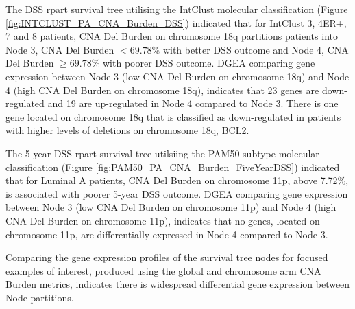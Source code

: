 The DSS rpart survival tree utilising the IntClust molecular classification (Figure \ref{fig:INTCLUST_PA_CNA_Burden_DSS}) indicated that for IntClust 3, 4ER+, 7 and 8 patients, CNA Del Burden on chromosome 18q partitions patients into Node 3, CNA Del Burden $<69.78\%$ with better DSS outcome and Node 4, CNA Del Burden $\geq 69.78\%$ with poorer DSS outcome. DGEA comparing gene expression between Node 3 (low CNA Del Burden on chromosome 18q) and Node 4 (high CNA Del Burden on chromosome 18q), indicates that 23 genes are down-regulated and 19 are up-regulated in Node 4 compared to Node 3. There is one gene located on chromosome 18q that is classified as down-regulated in patients with higher levels of deletions on chromosome 18q, BCL2. 

The 5-year DSS rpart survival tree utilsiing the PAM50 subtype molecular classification (Figure \ref{fig:PAM50_PA_CNA_Burden_FiveYearDSS}) indicated that for Luminal A patients, CNA Del Burden on chromosome 11p, above 7.72\%, is associated with poorer 5-year DSS outcome. DGEA comparing gene expression between Node 3 (low CNA Del Burden on chromosome 11p) and Node 4 (high CNA Del Burden on chromosome 11p), indicates that no genes, located on chromosome 11p, are differentially expressed in Node 4 compared to Node 3. 

Comparing the gene expression profiles of the survival tree nodes for focused examples of interest, produced using the global and chromosome arm CNA Burden metrics, indicates there is widespread differential gene expression between Node partitions. 

